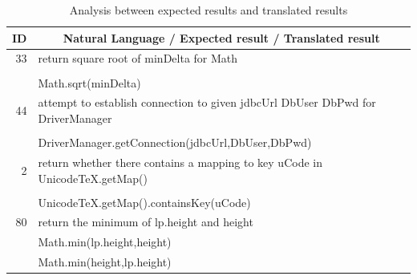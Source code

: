 \documentclass[sigconf,review,anonymous]{article}
\begin{document}
\begin{table}[]
\caption{Analysis between expected results and translated results}
\label{tbl:Q4StudyResult}
\centering
\begin{tabular}{|l|l|}
\hline
\multicolumn{1}{|c|}{\textbf{ID}} & \multicolumn{1}{c|}{\textbf{Natural Language / Expected result / Translated result}}        \\ \hline
\multicolumn{1}{|r|}{33}          & return square root of minDelta for Math                                                     \\ \hline
\rowcolor[HTML]{DAE8FC} 
                                  & \cellcolor[HTML]{DAE8FC}                                                                    \\ \cline{1-1}
\rowcolor[HTML]{DAE8FC} 
                                  & \multirow{-2}{*}{\cellcolor[HTML]{DAE8FC}Math.sqrt(minDelta)}                               \\ \hline
\multicolumn{1}{|r|}{44}          & attempt to establish connection to given jdbcUrl DbUser DbPwd for DriverManager             \\ \hline
\rowcolor[HTML]{DAE8FC} 
                                  & \cellcolor[HTML]{DAE8FC}                                                                    \\ \cline{1-1}
\rowcolor[HTML]{DAE8FC} 
                                  & \multirow{-2}{*}{\cellcolor[HTML]{DAE8FC}DriverManager.getConnection(jdbcUrl,DbUser,DbPwd)} \\ \hline
\multicolumn{1}{|r|}{2}           & return whether there contains a mapping to key uCode in UnicodeTeX.getMap()                 \\ \hline
\rowcolor[HTML]{DAE8FC} 
                                  & \cellcolor[HTML]{DAE8FC}                                                                    \\ \cline{1-1}
\rowcolor[HTML]{DAE8FC} 
                                  & \multirow{-2}{*}{\cellcolor[HTML]{DAE8FC}UnicodeTeX.getMap().containsKey(uCode)}            \\ \hline
\multicolumn{1}{|r|}{80}          & return the minimum of lp.height and height                                                  \\ \hline
\rowcolor[HTML]{FFCCC9} 
                                  & Math.min(lp.height,height)                                                                  \\ \hline
\rowcolor[HTML]{FFCCC9} 
                                  & Math.min(height,lp.height)                                                                  \\ \hline

\end{tabular}
\end{table}
\end{document}
